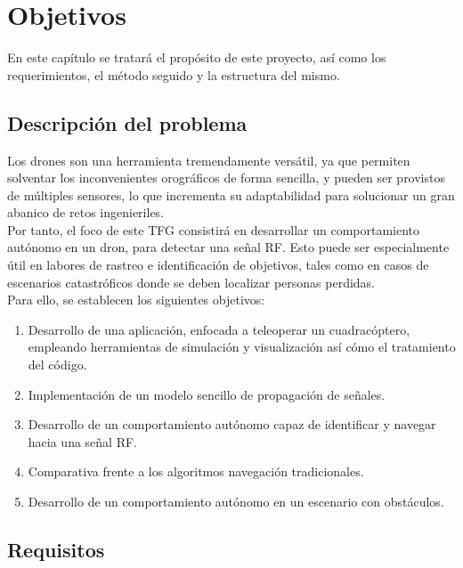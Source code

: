 \chapter{Objetivos}
\label{cap:capitulo2}

En este capítulo se tratará el propósito de este proyecto, así como los requerimientos, el método seguido y la estructura del mismo.\\

\section{Descripción del problema}
\label{sec:descripcion_problema}

Los drones son una herramienta tremendamente versátil, ya que permiten solventar los inconvenientes orográficos de forma sencilla, y pueden ser provistos de múltiples sensores, lo que incrementa su adaptabilidad para solucionar un gran abanico de retos ingenieriles.\\

Por tanto, el foco de este \ac{TFG} consistirá en desarrollar un comportamiento autónomo en un dron, para detectar una señal \ac{RF}. Esto puede ser especialmente útil en labores de rastreo e identificación de objetivos, tales como en casos de escenarios catastróficos donde se deben localizar personas perdidas.\\

Para ello, se establecen los siguientes objetivos:

\begin{enumerate}
	\item Desarrollo de una aplicación, enfocada a teleoperar un cuadracóptero, empleando herramientas de simulación y visualización así cómo el tratamiento del código.
	\item Implementación de un modelo sencillo de propagación de señales.
	\item Desarrollo de un comportamiento autónomo capaz de identificar y navegar hacia una señal \ac{RF}.
	\item Comparativa frente a los algoritmos navegación tradicionales.
	\item Desarrollo de un comportamiento autónomo en un escenario con obstáculos.
\end{enumerate}

\section{Requisitos}
\label{sec:requisitos}


